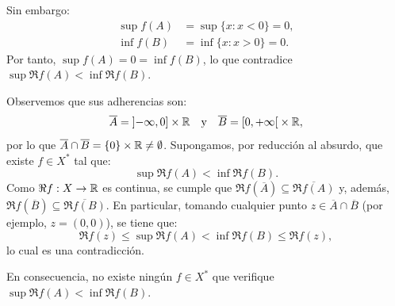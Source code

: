 \begin{ejercicio}
\begin{description}
        Sin embargo:
        \begin{align*}
            \sup f(A) &= \sup \{ x : x < 0\} = 0, \\
            \inf f(B) &= \inf \{ x : x > 0\} = 0.
        \end{align*}
        Por tanto, $\sup f(A) = 0 = \inf f(B)$, lo que contradice $\sup \Re f(A) < \inf \Re f(B)$.
        \item[Opción 2.] Observemos que sus adherencias son:
        \[
            \overline{A} = \left]-\infty, 0\right] \times \mathbb{R} \quad \text{y} \quad \overline{B} = \left[0, +\infty\right[ \times \mathbb{R},
        \]
        por lo que $\overline{A} \cap \overline{B} = \{0\} \times \mathbb{R} \neq \emptyset$. Supongamos, por reducción al absurdo, que existe $f \in X^*$ tal que:
        \[
            \sup \Re f(A) < \inf \Re f(B).
        \]
        Como $\Re f : X \to \mathbb{R}$ es continua, se cumple que $\Re f(\overline{A}) \subseteq \overline{\Re f(A)}$ y, además, $\Re f(\overline{B}) \subseteq \overline{\Re f(B)}$. En particular, tomando cualquier punto $z \in \overline{A} \cap \overline{B}$ (por ejemplo, $z = (0, 0)$), se tiene que:
        \[
            \Re f(z) \leq \sup \Re f(A) < \inf \Re f(B) \leq \Re f(z),
        \]
        lo cual es una contradicción. 
    \end{description}
    
    
    En consecuencia, no existe ningún $f \in X^*$ que verifique $\sup \Re f(A) < \inf \Re f(B)$.
\end{ejercicio}
